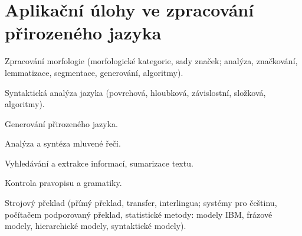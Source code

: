 \newpage
\section{Aplikační úlohy ve zpracování přirozeného jazyka}
\begin{pozadavky}
\begin{pitemize}
\item Zpracování morfologie (morfologické kategorie, sady značek; analýza, značkování, lemmatizace, segmentace, generování, algoritmy).
\item Syntaktická analýza jazyka (povrchová, hloubková, závislostní, složková, algoritmy).
\item Generování přirozeného jazyka.
\item Analýza a syntéza mluvené řeči.
\item Vyhledávání a extrakce informací, sumarizace textu.
\item Kontrola pravopisu a gramatiky.
\item Strojový překlad (přímý překlad, transfer, interlingua; systémy pro češtinu, počítačem podporovaný překlad, statistické metody: modely IBM, frázové modely, hierarchické modely, syntaktické modely).
\end{pitemize}
\end{pozadavky}